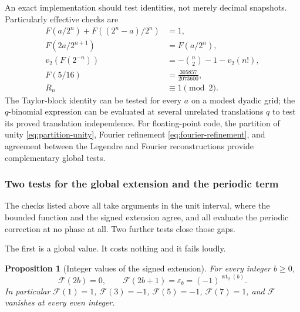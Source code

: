 \documentclass[11pt,oneside]{article}
\newtheorem{proposition}[theorem]{Proposition}
\theoremstyle{definition}
\theoremstyle{remark}
\newcommand{\wt}{\operatorname{wt}_2}
\newcommand{\vtwo}{v_2}
\begin{document}
An exact implementation should test identities, not merely decimal snapshots.  Particularly
effective checks are
\begin{align}
 F(a/2^n)+F((2^n-a)/2^n)&=1,                              \label{eq:test-symmetry}\\
 F(2a/2^{n+1})&=F(a/2^n),                                 \label{eq:test-refinement}\\
 \vtwo(F(2^{-n}))&=-\binom n2-1-\vtwo(n!),                \label{eq:test-valuation}\\
 F(5/16)&=\frac{305857}{2073600},                         \label{eq:test-five-sixteen}\\
 R_n&\equiv1\pmod2.                                       \label{eq:test-Rn-odd}
\end{align}
The Taylor-block identity can be tested for every $a$ on a modest dyadic grid; the
$q$-binomial expression can be evaluated at several unrelated translations $q$ to test its
proved translation independence.  For floating-point code, the partition of unity
\eqref{eq:partition-unity}, Fourier refinement \eqref{eq:fourier-refinement}, and agreement
between the Legendre and Fourier reconstructions provide complementary global tests.


\subsubsection{Two tests for the global extension and the periodic term}
\label{sec:aud-verification-extra}

The checks listed above all take arguments in the unit interval, where the bounded function
and the signed extension agree, and all evaluate the periodic correction at no phase at all.
Two further tests close those gaps.

The first is a global value.  It costs nothing and it fails loudly.

\begin{proposition}[Integer values of the signed extension]
\label{prop:aud-integer-values}
For every integer $b\ge0$,
\begin{equation}
 \mathcal F(2b)=0,
 \qquad
 \mathcal F(2b+1)=\varepsilon_{b}=(-1)^{\wt(b)}.
                                                          \label{eq:aud-integer-values}
\end{equation}
In particular $\mathcal F(1)=1$, $\mathcal F(3)=-1$, $\mathcal F(5)=-1$, $\mathcal F(7)=1$,
and $\mathcal F$ vanishes at every even integer.
\end{proposition}
\end{document}
